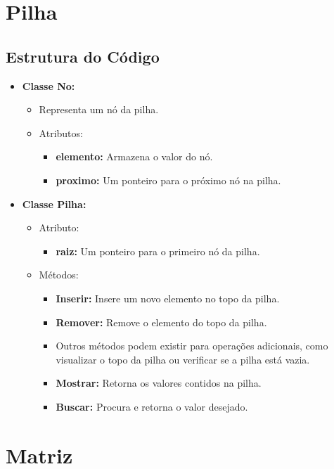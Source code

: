 \documentclass{article}
\begin{document}
\section*{Pilha}

\subsection*{Estrutura do Código}
\begin{itemize}
    \item \textbf{Classe No:}
    \begin{itemize}
        \item Representa um nó da pilha.
        \item Atributos:
        \begin{itemize}
            \item \textbf{elemento:} Armazena o valor do nó.
            \item \textbf{proximo:} Um ponteiro para o próximo nó na pilha.
        \end{itemize}
    \end{itemize}
    \item \textbf{Classe Pilha:}
    \begin{itemize}
        \item Atributo:
        \begin{itemize}
            \item \textbf{raiz:} Um ponteiro para o primeiro nó da pilha.
        \end{itemize}
        \item Métodos:
        \begin{itemize}
            \item \textbf{Inserir:} Insere um novo elemento no topo da pilha.
            \item \textbf{Remover:} Remove o elemento do topo da pilha.
            \item Outros métodos podem existir para operações adicionais, como visualizar o topo da pilha ou verificar se a pilha está vazia.
            \item \textbf{Mostrar:} Retorna os valores contidos na pilha.
            \item \textbf{Buscar:} Procura e retorna o valor desejado.
        \end{itemize}
    \end{itemize}
\end{itemize}

\section*{Matriz}
\end{document}
